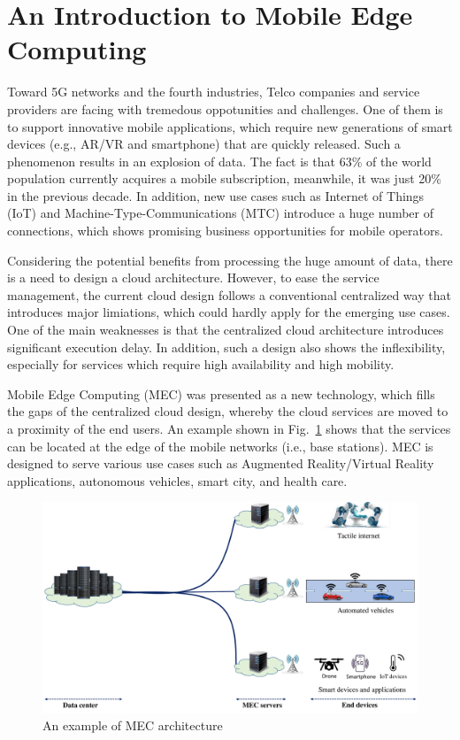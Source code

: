 \section{An Introduction to Mobile Edge Computing}  \label{intro}


Toward 5G networks and the fourth industries, Telco companies and service providers are facing with tremedous oppotunities and challenges. One of them is to support innovative mobile applications, which require new generations of smart devices (e.g., AR/VR and smartphone) that are quickly released. Such a phenomenon results in an explosion of data. The fact is that 63\% of the world population currently acquires a mobile subscription, meanwhile, it was just 20\% in the previous decade. In addition, new use cases such as Internet of Things (IoT) and Machine-Type-Communications (MTC) introduce a huge number of connections, which shows promising business opportunities for mobile operators.

Considering the potential benefits from processing the huge amount of data, there is a need to design a cloud architecture. However, to ease the service management, the current cloud design follows a conventional centralized way that introduces major limiations, which could hardly apply for the emerging use cases. One of the main weaknesses is that the centralized cloud architecture introduces significant execution delay. In addition, such a design also shows the inflexibility, especially for services which require high availability and high mobility. 

Mobile Edge Computing (MEC) was presented as a new technology, which fills the gaps of the centralized cloud design, whereby the cloud services are moved to a proximity of the end users. An example shown  in Fig.~\ref{fig:mec-arch} shows that the services can be located at the edge of the mobile networks (i.e., base stations). MEC is designed to serve various use cases such as Augmented Reality/Virtual Reality applications, autonomous vehicles, smart city, and health care.


\begin{figure}[H]
  \begin{center}
   \includegraphics[width=13cm]{./figures/mec-arch.pdf}
   \caption{An example of MEC architecture}
   \label{fig:mec-arch}
   \end{center}
\end{figure}
